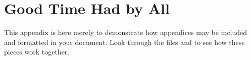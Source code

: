 \chapter{Good Time Had by All}

This appendix is here merely to demonstrate how appendices may be
included and formatted in your document.  Look through the files
 and  to see how these pieces work
together.

